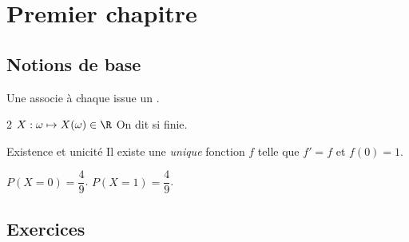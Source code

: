 
\section{Premier chapitre}

\subsection{Notions de base}

\begin{Definition}
Une associe à chaque issue un .
\begin{MultiColonnes}{2}
    \tcbitem $X : \omega \mapsto X(\omega) \in \R$
    \tcbitem On dit  si finie.
\end{MultiColonnes}
\end{Definition}

\begin{Propriete}{Existence et unicité}
Il existe une \emph{unique} fonction $f$ telle que $f' = f$ et $f(0) = 1$.
\end{Propriete}


\begin{Exemple}
\begin{tcbenumerate}[2]
    \tcbitem $P(X = 0) = \dfrac{4}{9}$.
    \tcbitem $P(X = 1) = \dfrac{4}{9}$.
\end{tcbenumerate}
\vspace{-0.3cm}\end{Exemple}

\subsection{Exercices}

